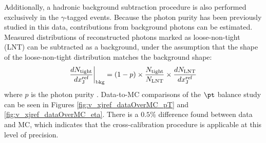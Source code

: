\documentclass[NOTE, atlasdraft=true, texlive=2016, USenglish]{\ATLASLATEXPATH atlasdoc}
\begin{document}
Additionally, a hadronic background subtraction procedure is also performed exclusively in the $\gamma$-tagged events. Because the photon purity has been previously studied in this data, contributions from background photons can be estimated. Measured distributions of reconstructed photons marked as loose-non-tight (LNT) can be subtracted as a background, under the assumption that the shape of the loose-non-tight distribution matches the background shape:
\begin{equation}
	\frac{dN_{\text{tight}}}{dx^{\text{ref}}_{\text{J}}}\bigg{|}_{\text{bkg}} = (1 - p) \times \frac{N_{\text{tight}}}{N_{\text{LNT}}} \times \frac{dN_{\text{LNT}}}{dx^{\text{ref}}_{\text{J}}}
	\label{eq:bkg}
\end{equation}
 where $p$ is the photon purity \cite{ATL-COM-PHYS-2017-999}. Data-to-MC comparisons of the $\pt$ balance study can be seen in Figures \ref{fig:v_xjref_dataOverMC_pT} and \ref{fig:v_xjref_dataOverMC_eta}. There is a $0.5\%$ difference found between data and MC, which indicates that the cross-calibration procedure is applicable at this level of precision.

%
%
\end{document}
